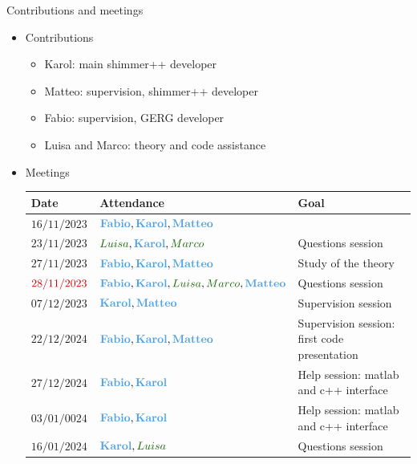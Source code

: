 
\begin{frame}{Contributions and meetings}
\begin{itemize}
    \item Contributions
    \begin{itemize}
        \item Karol: main shimmer++ developer
        \item Matteo: supervision, shimmer++ developer
        \item Fabio: supervision, GERG developer
        \item Luisa and Marco: theory and code assistance
    \end{itemize}
    
\item Meetings
\small
\begin{table}[H]
\begin{tabular}{lll}
\hline
Date & Attendance & Goal \\
\hline
\small
$16/11/2023$ &	$\DISMA{Fabio}, \DISMA{Karol}, \DISMA{Matteo}$	& \\
$23/11/2023$ &	$\DENERG{Luisa}, \DISMA{Karol}, \DENERG{Marco}$ 	& Questions session\\
$27/11/2023$ &	$\DISMA{Fabio}, \DISMA{Karol}, \DISMA{Matteo}$ &	Study of the theory\\
$\cred{28/11/2023}$ &	$\DISMA{Fabio}, \DISMA{Karol}, \DENERG{Luisa}, \DENERG{Marco}, \DISMA{Matteo}$  &	Questions session \\
$07/12/2023$ &	$\DISMA{Karol}, \DISMA{Matteo}$	& Supervision session \\
$22/12/2024$ &	$\DISMA{Fabio}, \DISMA{Karol}, \DISMA{Matteo}$	& Supervision session: first code presentation \\
$27/12/2024$ &	$\DISMA{Fabio}, \DISMA{Karol}$	&  Help session: matlab and c++ interface\\
$03/01/0024$ & $\DISMA{Fabio}, \DISMA{Karol}$ &	Help session: matlab and c++ interface\\
$16/01/2024$ &	$\DISMA{Karol},\DENERG{Luisa}$  & 	Questions session \\
\hline
\end{tabular}
\end{table}
\end{itemize}

\end{frame}

